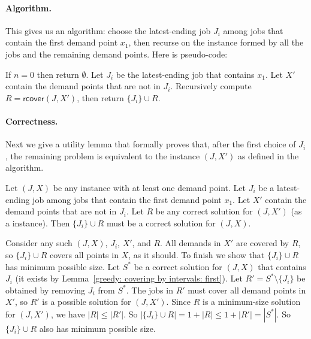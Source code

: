 \paragraph{Algorithm.}
This gives us an algorithm:
choose the latest-ending job $J_i$ among jobs that contain the first demand point $x_1$,
then recurse on the instance formed by all the jobs and the remaining demand points.
Here is pseudo-code:
\begin{myframed}
  \begin{steps}
  \item[{\textsf{rcover}$(J, X)$ where $J=(J_1, J_2, \ldots, J_m)$ and $X=(x_1, x_2, \ldots, x_n)$:}]
    \step If $n = 0$ then return $\emptyset$.  
    \step Let $J_i$ be the latest-ending job that contains $x_1$.
    \step Let $X'$ contain the demand points that are not in $J_i$.
    \step Recursively compute $R = \textsf{rcover}(J, X')$, then return $\{J_i\} \cup R$.
  \end{steps}
\end{myframed}

\paragraph{Correctness.}
Next we give a utility lemma that formally proves that,
after the first choice of $J_i$, the remaining problem is equivalent
to the instance $(J, X')$ as defined in the algorithm.

\begin{lemma}\label{greedy: lemma: as recurse}
  Let $(J, X)$ be any  instance with at least one demand point.
  Let $J_i$ be a latest-ending job among jobs that contain the first demand point $x_1$.
  Let $X'$ contain the demand points that are not in $J_i$.
  Let $R$ be any correct solution for $(J, X')$ (as a  instance).
  Then $\{J_i\}\cup R$ must be a correct solution for $(J, X)$.
\end{lemma}
\begin{longFormProof}
  \step Consider any such $(J, X)$, $J_i$, $X'$, and $R$.
  \step All demands in $X'$ are covered by $R$, so $\{J_i\}\cup R$ covers all points in $X$, as it should.
  \step To finish we show that $\{J_i\}\cup R$ has minimum possible size.
  \step Let $S^*$ be a correct solution for $(J, X)$ that contains $J_i$ (it exists by Lemma~\ref{greedy: covering by intervals: first}).
  \step Let $R' = S^*\setminus\{J_i\}$ be obtained by removing $J_i$ from $S^*$.
  \step\label{greedy: step: as soln}
  The jobs in $R'$ must cover all demand points in $X'$, so $R'$ is a possible solution for $(J, X')$.
  \step Since $R$ is a minimum-size solution for $(J, X')$, we have $|R| \le |R'|$.
  \step So \(|\{J_i\} \cup R| = 1 + |R| \le 1+|R'| =  |S^*|\).  So $\{J_i\} \cup R$ also has minimum possible size.
\end{longFormProof}

